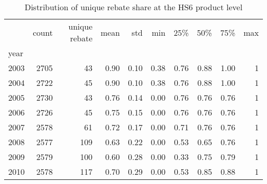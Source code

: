 \documentclass[preview]{standalone}
\begin{document}
\begin{table}[!htbp] \centering
\caption{Distribution of unique rebate share at the HS6 product level}

\begin{adjustbox}{width=\textwidth, totalheight=\baselineskip,keepaspectratio}
\begin{tabular}{lrrrrrrrrr}
\toprule
{} &  count &  unique rebate &  mean &   std &   min &   25\% &   50\% &   75\% &  max \\
year &        &                &       &       &       &       &       &       &      \\
\midrule
2003 &   2705 &             43 &  0.90 &  0.10 &  0.38 &  0.76 &  0.88 &  1.00 &    1 \\
2004 &   2722 &             45 &  0.90 &  0.10 &  0.38 &  0.76 &  0.88 &  1.00 &    1 \\
2005 &   2730 &             43 &  0.76 &  0.14 &  0.00 &  0.76 &  0.76 &  0.76 &    1 \\
2006 &   2726 &             45 &  0.75 &  0.15 &  0.00 &  0.76 &  0.76 &  0.76 &    1 \\
2007 &   2578 &             61 &  0.72 &  0.17 &  0.00 &  0.71 &  0.76 &  0.76 &    1 \\
2008 &   2577 &            109 &  0.63 &  0.22 &  0.00 &  0.53 &  0.65 &  0.76 &    1 \\
2009 &   2579 &            100 &  0.60 &  0.28 &  0.00 &  0.33 &  0.75 &  0.79 &    1 \\
2010 &   2578 &            117 &  0.70 &  0.29 &  0.00 &  0.53 &  0.85 &  0.88 &    1 \\
\bottomrule
\end{tabular}

\end{adjustbox}

\begin{tablenotes}
\small
\item


\end{tablenotes}
\end{table}
\end{document}

